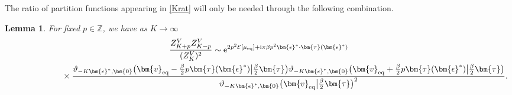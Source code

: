 \documentclass[pdftex]{sigma}
\numberwithin{equation}{section}
\newtheorem{Lemma}[Theorem]{Lemma}
\begin{document}
The ratio of partition functions appearing in \eqref{Krat} will only be needed through the following combination.
\begin{Lemma}\label{ratioZ}
 For fixed $p \in \mathbb{Z}$, we have as $K \rightarrow \infty$
 \begin{gather*}
	 \frac{Z_{K + p}^{V}Z_{K - p}^{V}}{(Z_K^V)^2}\sim{\rm e}^{2p^2 \mathcal{E}[\mu_{{\rm eq}}] + {\rm i}\pi \beta p^2 \bm{\epsilon}^* \cdot \bm{\tau}(\bm{\epsilon}^*)} \\
\hphantom{\frac{Z_{K + p}^{V}Z_{K - p}^{V}}{(Z_K^V)^2}\sim}{}\times\frac{\vartheta_{-K\bm{\epsilon}^*,\bm{0}}\bigl(\bm{v}_{{\rm eq}} - \tfrac{\beta}{2}p\bm{\tau}(\bm{\epsilon}^*)\big|\tfrac{\beta}{2}\bm{\tau}\bigr) \vartheta_{-K\bm{\epsilon}^*,\bm{0}}\bigl(\bm{v}_{{\rm eq}} + \tfrac{\beta}{2} p \bm{\tau}(\bm{\epsilon}^*)\big|\tfrac{\beta}{2}\bm{\tau}\bigr)}{\vartheta_{-K\bm{\epsilon}^*,\bm{0}}\bigl(\bm{v}_{{\rm eq}}\big|\frac{\beta}{2}\bm{\tau}\bigr)^{2}}.
 \end{gather*}
\end{Lemma}
\end{document}
